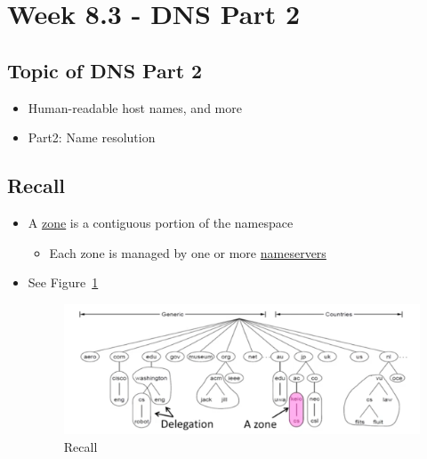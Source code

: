 \documentclass[12pt]{ctexart}   %
\begin{document}
\section{Week 8.3 - DNS Part 2}
	\subsection{Topic of DNS Part 2 }
	\begin{itemize}
		\item Human-readable host names, and more
		\item Part2: Name resolution
	\end{itemize}
	
	\subsection{Recall}
	\begin{itemize}
		\item A \underline{zone} is a contiguous portion of the namespace
		\begin{itemize}
			\item Each zone is managed by one or more \underline{nameservers}
		\end{itemize}
		\item See Figure~\ref{fig:8-3-1}
		  
		 \begin{figure}[h!] %
		\centering
		 \includegraphics[scale=0.7]{images/8-3-1}
		\caption{ Recall }
		 \label{fig:8-3-1}
		 \end{figure}
	\end{itemize}
	
\end{document}
